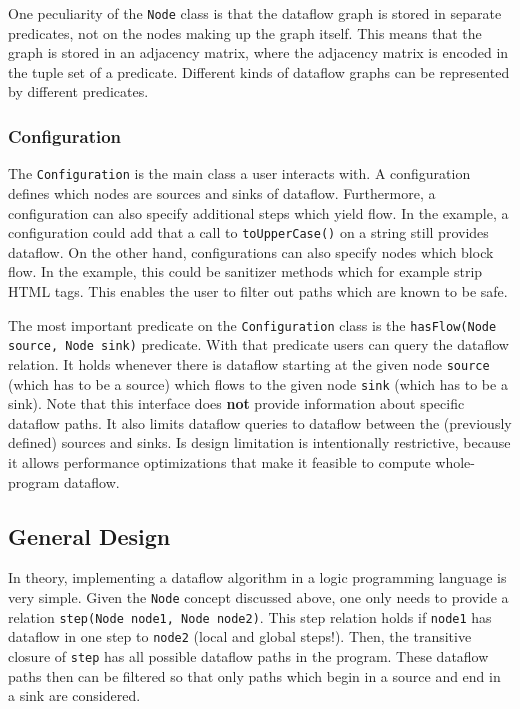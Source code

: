 One peculiarity of the \texttt{Node} class is that the dataflow graph
is stored in separate predicates, not on the nodes making up the graph itself.
This means that the graph is stored in an adjacency matrix, where the adjacency matrix is encoded in the tuple 
set of a predicate.
Different kinds of dataflow graphs can be represented by different predicates.

\subsubsection*{Configuration}
The \texttt{Configuration} is the main class a user interacts with.
A configuration defines which nodes are sources and sinks of dataflow.
Furthermore, a configuration can also specify additional steps which yield flow.
In the example, a configuration could add that a call to 
\texttt{toUpperCase()} on a string still provides dataflow.
On the other hand, configurations can also specify nodes which block flow.
In the example, this could be sanitizer methods which for example strip HTML tags.
This enables the user to filter out paths which are known to be safe.

The most important predicate on the \texttt{Configuration} class 
is the \texttt{hasFlow(Node source, Node sink)} predicate.
With that predicate users can query the dataflow relation.
It holds whenever there is dataflow starting at the given node \texttt{source} 
(which has to be a source) which flows to the given node \texttt{sink} (which has to be a sink).
Note that this interface does \textbf{not} provide information about specific
dataflow paths.
It also limits dataflow queries to dataflow between the (previously defined) sources and sinks.
Is design limitation is intentionally restrictive, because it allows performance optimizations
that make it feasible to compute whole-program dataflow.

\subsection{General Design}


In theory, implementing a dataflow algorithm in a logic programming language is very simple.
Given the \texttt{Node} concept discussed above, one only needs to provide a relation
\texttt{step(Node node1, Node node2)}.
This step relation holds if \texttt{node1} has dataflow in one step to \texttt{node2}
(local and global steps!).
Then, the transitive closure of \texttt{step} has all possible dataflow paths in the program.
These dataflow paths then can be filtered so that only paths which begin in a source and 
end in a sink are considered.

